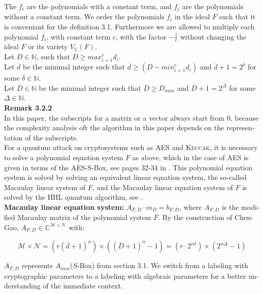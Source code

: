 \documentclass[a4paper,11pt]{article}
\begin{document}
\begin{otherlanguage}{english}
\noindent
The $f_i$ are the polynomials with a constant term, and $f_j$ are the polynomials without a constant term. We order the polynomials $f_i$ in the ideal $F$ such that it is conveniant for the definition 3.1. Furthermore we are allowed to multiply each polynomial $f_i$, with constant term $c$, with the factor $-\frac{1}{c}$ without changing the ideal $F$ or its variety $V_\mathbb{C}(F)$.\\


\noindent
Let $D \in \mathbb{N}$, such that $D \geq max_{i=1}^r d_i$. \\
Let $\overline{d}$ be the minimal integer such that $\overline{d} \geq (D - min_{i=1}^r d_i)$ and $\overline{d}+1= 2^\delta$ for some $\delta \in \mathbb{N}$. \\
Let $\overline{D} \in \mathbb{N}$ be the minimal integer such that $\overline{D} \geq D_{max}$ and $\overline{D}+1 = 2^\Delta$ for some $\Delta \in \mathbb{N}$. \\ 

\noindent
\textbf{Remark 3.2.2} \\
In this paper, the subscripts for a matrix or a vector always start from 0, because the complexity analysis oft the algorithm in this paper depends on the representation of the subscripts. \\

\noindent
For a quantum attack on cryptosystems such as \textsc{AES} and \textsc{Keccak}, it is necessary to solve a polynomial equation system $F$ as above, which in the case of \textsc{AES} is given in terms of the \textsc{AES}-S-Box, see pages 32-34 in \cite{QAA}. This polynomial equation system is solved by solving an equivalent linear equation system, the so-called Macaulay linear system \cite{MCA} of $F$, and the Macaulay linear equation system of $F$ is solved by the \textsc{HHL} quantum algorithm, see \cite{HHL}.\\

\noindent
\textbf{Macaulay linear equation system:} $A_{F,D} \cdot m_D = b_{F,D}$,
where $A_{F,D}$ is the modified Macaulay matrix of the polynomial system $F$. By the construction of Chen-Gao, $A_{F,D} \in \mathbb{C}^{\mathcal{M} \times \mathcal{N}}$ with:

$$\mathcal{M} \times \mathcal{N} = ( r (\overline{d}+1)^n ) \times ((\overline{D} + 1 )^n -1) 
= (r \cdot 2^{n \delta}) \times (2^{n \Delta} -1 )$$

\noindent
$A_{F,D}$ represents $A_{mca}$($S$-Box) from section 3.1. We switch from a labeling with cryptographic parameters to a labeling with algebraic parameters for a better understanding of the immediate context.\\


\end{otherlanguage}
\end{document}
